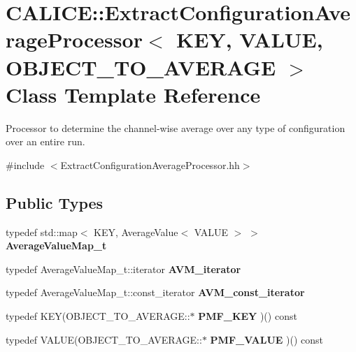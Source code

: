 \section{CALICE::ExtractConfigurationAverageProcessor$<$ KEY, VALUE, OBJECT\_\-TO\_\-AVERAGE $>$ Class Template Reference}
\label{classCALICE_1_1ExtractConfigurationAverageProcessor}


Processor to determine the channel-\/wise average over any type of configuration over an entire run.  


{\ttfamily \#include $<$ExtractConfigurationAverageProcessor.hh$>$}\subsection*{Public Types}
\begin{DoxyCompactItemize}
\item 
typedef std::map$<$ KEY, AverageValue$<$ VALUE $>$ $>$ {\bfseries AverageValueMap\_\-t}\label{classCALICE_1_1ExtractConfigurationAverageProcessor_a9c98d937494a57cb0002414676ef0a0b}

\item 
typedef AverageValueMap\_\-t::iterator {\bfseries AVM\_\-iterator}\label{classCALICE_1_1ExtractConfigurationAverageProcessor_af2676889c0cabe4ef45a8d0a41953f22}

\item 
typedef AverageValueMap\_\-t::const\_\-iterator {\bfseries AVM\_\-const\_\-iterator}\label{classCALICE_1_1ExtractConfigurationAverageProcessor_ae898392ad5d30a3cf24636368c1f1817}

\item 
typedef KEY(OBJECT\_\-TO\_\-AVERAGE::$\ast$ {\bfseries PMF\_\-KEY} )() const \label{classCALICE_1_1ExtractConfigurationAverageProcessor_ac14ddbcd21b11b49846b2e9f6179806f}

\item 
typedef VALUE(OBJECT\_\-TO\_\-AVERAGE::$\ast$ {\bfseries PMF\_\-VALUE} )() const \label{classCALICE_1_1ExtractConfigurationAverageProcessor_a77c343fefe0aa8c92d90c2c841f2ba0f}

\end{DoxyCompactItemize}
